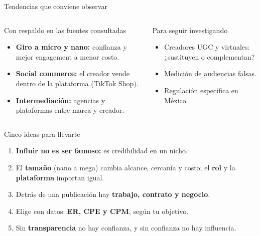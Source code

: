 \documentclass[aspectratio=169,xcolor=dvipsnames]{beamer}
\begin{document}
\begin{frame}{Tendencias que conviene observar}
\begin{columns}[T]
  \begin{block}{Con respaldo en las fuentes consultadas}
    \small
    \begin{itemize}
      \item \textbf{Giro a micro y nano:} confianza y mejor engagement a menor costo.
      \item \textbf{Social commerce:} el creador vende dentro de la plataforma (TikTok Shop).
      \item \textbf{Intermediación:} agencias y plataformas entre marca y creador.
    \end{itemize}
  \end{block}
  \begin{exampleblock}{Para seguir investigando}
    \small
    \begin{itemize}
      \item Creadores UGC y virtuales: ¿sustituyen o complementan?
      \item Medición de audiencias falsas.
      \item Regulación específica en México.
    \end{itemize}
  \end{exampleblock}
\end{columns}
\end{frame}

\begin{frame}{Cinco ideas para llevarte}
\begin{enumerate}
  \item \textbf{Influir no es ser famoso:} es credibilidad en un nicho.
  \vspace{3pt}
  \item El \textbf{tamaño} (nano a mega) cambia alcance, cercanía y costo; el \textbf{rol} y la \textbf{plataforma} importan igual.
  \vspace{3pt}
  \item Detrás de una publicación hay \textbf{trabajo, contrato y negocio}.
  \vspace{3pt}
  \item Elige con datos: \textbf{ER, CPE y CPM}, según tu objetivo.
  \vspace{3pt}
  \item Sin \textbf{transparencia} no hay confianza, y sin confianza no hay influencia.
\end{enumerate}
\end{frame}
\end{document}
